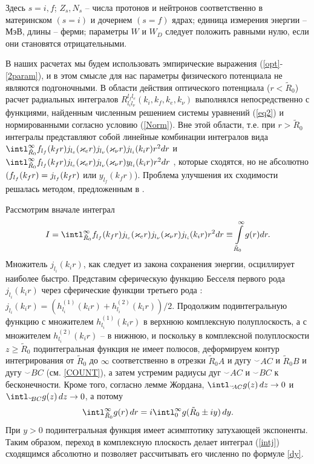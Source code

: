 Здесь $s=i,f$; $Z_s, N_s$ -- числа протонов и нейтронов соответственно
в материнском $(s=i)$ и дочернем $(s=f)$ ядрах; единица измерения энергии -- МэВ,
длины -- ферми; параметры $W$ и $W_D$ следует положить равными нулю,
если они становятся отрицательными.

В наших расчетах мы будем использовать эмпирические выражения
(\ref{opt}-\ref{2param}), и в этом смысле для нас параметры
физического потенциала не являются подгоночными.
В области действия оптического потенциала ($r<\tilde R_0$)
расчет радиальных интегралов $R_{l_il_\nu}^{l_fl_e}(k_i,k_f,k_e,k_\nu)$ выполнялся непосредственно
с функциями, найденным численным решением системы уравнений (\ref{eq2})
и нормированными согласно условию  (\ref{Norm}).
Вне этой области, т.е. при $r>\tilde R_0$  интегралы
представляют собой линейные комбинации интегралов вида
$\intl_{\tilde R_0}^{\infty} f_{l_f}(k_fr)
j_{l_e}(\varkappa_e r)j_{l_\nu}(\varkappa_\nu r) j_{l_i}(k_i r)r^2dr $
и
$\intl_{\tilde R_0}^{\infty} f_{l_f}(k_fr)
j_{l_e}(\varkappa_e r)j_{l_\nu}(\varkappa_\nu r) y_{l_i}(k_i r)r^2dr $
, которые
сходятся, но не абсолютно $\\(f_{l_f}(k_fr)=j_{l_f}(k_fr)$  или $y_{l_f}(k_fr)$).
Проблема  улучшения их сходимости решалась методом,
предложенным в \cite{PhR1970}.

Рассмотрим вначале интеграл
\begin{equation}\label{intj}
I=\intl_{\tilde R_0}^{\infty} f_{l_f}(k_fr)
j_{l_e}(\varkappa_e r)j_{l_\nu}(\varkappa_\nu r) j_{l_i}(k_i r)r^2dr\equiv
\int\limits_{\tilde R_0}^\infty g(r)dr.
\end{equation}
Множитель $j_{l_i}(k_i r)$, как следует из закона сохранения энергии, осциллирует наиболее быстро. Представим сферическую
функцию Бесселя первого рода $j_{l_i}(k_i r)$ через сферические функции третьего рода \cite{abramc}: $j_{l_i}(k_i
r)=(h^{(1)}_{l_i}(k_i r)+ h^{(2)}_{l_i}(k_i r))/2.$ Продолжим подинтегральную функцию с множителем $h^{(1)}_{l_i}(k_i r)$
в верхнюю комплексную полуплоскость, а с множителем $h^{(2)}_{l_i}(k_i r)$ -- в нижнюю, и поскольку в комплексной
полуплоскости
$z\geqslant \tilde R_0$ подинтегральная функция  не имеет полюсов,
деформируем контур
интегрирования от $\tilde R_0$ до $\infty$ соответственно
в отрезки $\tilde R_0 A$ и дугу
${}^{\smallsmile}\!\!AC$ и $\tilde R_0 B$ и дугу ${}^{\smallsmile}\!\!BC$ (см. \ref{COUNT}),
а затем устремим радиусы
дуг ${}^{\smallsmile}\!\!AC$ и ${}^{\smallsmile}\!\!BC$ к бесконечности.
Кроме того, согласно
лемме Жордана, $\intl_{{}^{\smallsmile}\!\!AC}g(z)\,dz\to0$ и
$\intl_{{}^{\smallsmile}\!\!BC}g(z)\,dz\to0$, а потому
\begin{equation}
\label{dy}
\intl_{\tilde R_0}^{\infty} g(r)\,dr=
i\intl_0^{\infty}g(\tilde R_0 \pm iy)\,dy.
\end{equation}
При $y>0$ подинтегральная функция имеет асимптотику затухающей экспоненты.
Таким образом, переход в комплексную плоскость делает интеграл
(\ref{intj}) сходящимся абсолютно и позволяет рассчитывать его численно
по формуле \eqref{dy}.


